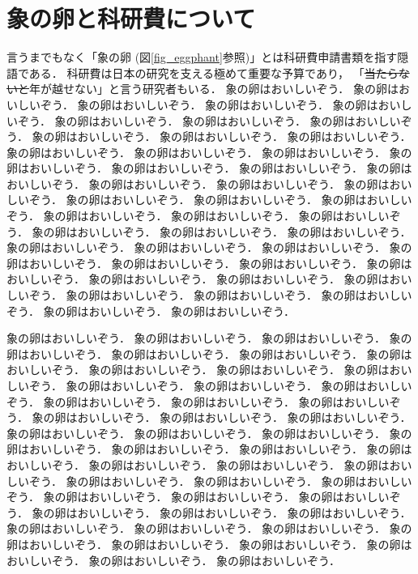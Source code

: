 \documentclass[b5paper,papersize,twocolumn]{jsarticle}
\providecommand{\DIFadd}[1]{{\protect\color{blue}\uwave{#1}}} %
\providecommand{\DIFdel}[1]{{\protect\color{red}\sout{#1}}}                      %
\providecommand{\DIFaddbegin}{} %
\providecommand{\DIFaddend}{} %
\providecommand{\DIFdelbegin}{} %
\providecommand{\DIFdelend}{} %
\newcommand{\DIFscaledelfig}{0.5}
\newlength{\DIFdelgraphicswidth} %
\newlength{\DIFdelgraphicsheight} %
\newcommand{\DIFaddincludegraphics}[2][]{{\color{blue}\fbox{\DIFOincludegraphics[#1]{#2}}}} %
\newcommand{\DIFdelincludegraphics}[2][]{%
\sbox{\DIFdelgraphicsbox}{\DIFOincludegraphics[#1]{#2}}%
\settoboxwidth{\DIFdelgraphicswidth}{\DIFdelgraphicsbox} %
\settoboxtotalheight{\DIFdelgraphicsheight}{\DIFdelgraphicsbox} %
\scalebox{\DIFscaledelfig}{%
\parbox[b]{\DIFdelgraphicswidth}{\usebox{\DIFdelgraphicsbox}\\[-\baselineskip] \rule{\DIFdelgraphicswidth}{0em}}\llap{\resizebox{\DIFdelgraphicswidth}{\DIFdelgraphicsheight}{%
\setlength{\unitlength}{\DIFdelgraphicswidth}%
\begin{picture}(1,1)%
\thicklines\linethickness{2pt} %
{\color[rgb]{1,0,0}\put(0,0){\framebox(1,1){}}}%
{\color[rgb]{1,0,0}\put(0,0){\line( 1,1){1}}}%
{\color[rgb]{1,0,0}\put(0,1){\line(1,-1){1}}}%
\end{picture}%
}\hspace*{3pt}}} %
} %
\DeclareRobustCommand{\DIFaddbegin}{\DIFOaddbegin \let\includegraphics\DIFaddincludegraphics} %
\DeclareRobustCommand{\DIFaddend}{\DIFOaddend \let\includegraphics\DIFOincludegraphics} %
\DeclareRobustCommand{\DIFdelbegin}{\DIFOdelbegin \let\includegraphics\DIFdelincludegraphics} %
\DeclareRobustCommand{\DIFdelend}{\DIFOaddend \let\includegraphics\DIFOincludegraphics} %
\begin{document}
\section{象の卵と科研費について}
言うまでもなく「象の卵 (図\ref{fig_eggphant}参照)」とは科研費申請書類を指す隠語である．
科研費は日本の研究を支える極めて重要な予算であり，
「\DIFdelbegin \DIFdel{当たらないと}\DIFdelend \DIFaddbegin \DIFadd{獲得しないと}\DIFaddend 年が越せない」と言う研究者もいる．
象の卵はおいしいぞう．
象の卵はおいしいぞう．
象の卵はおいしいぞう．
象の卵はおいしいぞう．
象の卵はおいしいぞう．
象の卵はおいしいぞう．
象の卵はおいしいぞう．
象の卵はおいしいぞう．
象の卵はおいしいぞう．
象の卵はおいしいぞう．
象の卵はおいしいぞう．
象の卵はおいしいぞう．
象の卵はおいしいぞう．
象の卵はおいしいぞう．
象の卵はおいしいぞう．
象の卵はおいしいぞう．
象の卵はおいしいぞう．
象の卵はおいしいぞう．
象の卵はおいしいぞう．
象の卵はおいしいぞう．
象の卵はおいしいぞう．
象の卵はおいしいぞう．
象の卵はおいしいぞう．
象の卵はおいしいぞう．
象の卵はおいしいぞう．
象の卵はおいしいぞう．
象の卵はおいしいぞう．
象の卵はおいしいぞう．
象の卵はおいしいぞう．
象の卵はおいしいぞう．
象の卵はおいしいぞう．
象の卵はおいしいぞう．
象の卵はおいしいぞう．
象の卵はおいしいぞう．
象の卵はおいしいぞう．
象の卵はおいしいぞう．
象の卵はおいしいぞう．
象の卵はおいしいぞう．
象の卵はおいしいぞう．
象の卵はおいしいぞう．
象の卵はおいしいぞう．
象の卵はおいしいぞう．
象の卵はおいしいぞう．
象の卵はおいしいぞう．
象の卵はおいしいぞう．



象の卵はおいしいぞう．
象の卵はおいしいぞう．
象の卵はおいしいぞう．
象の卵はおいしいぞう．
象の卵はおいしいぞう．
象の卵はおいしいぞう．
象の卵はおいしいぞう．
象の卵はおいしいぞう．
象の卵はおいしいぞう．
象の卵はおいしいぞう．
象の卵はおいしいぞう．
象の卵はおいしいぞう．
象の卵はおいしいぞう．
象の卵はおいしいぞう．
象の卵はおいしいぞう．
象の卵はおいしいぞう．
象の卵はおいしいぞう．
象の卵はおいしいぞう．
象の卵はおいしいぞう．
象の卵はおいしいぞう．
象の卵はおいしいぞう．
象の卵はおいしいぞう．
象の卵はおいしいぞう．
象の卵はおいしいぞう．
象の卵はおいしいぞう．
象の卵はおいしいぞう．
象の卵はおいしいぞう．
象の卵はおいしいぞう．
象の卵はおいしいぞう．
象の卵はおいしいぞう．
象の卵はおいしいぞう．
象の卵はおいしいぞう．
象の卵はおいしいぞう．
象の卵はおいしいぞう．
象の卵はおいしいぞう．
象の卵はおいしいぞう．
象の卵はおいしいぞう．
象の卵はおいしいぞう．
象の卵はおいしいぞう．
象の卵はおいしいぞう．
象の卵はおいしいぞう．
象の卵はおいしいぞう．
象の卵はおいしいぞう．
象の卵はおいしいぞう．
象の卵はおいしいぞう．
象の卵はおいしいぞう．
象の卵はおいしいぞう．
\end{document}
